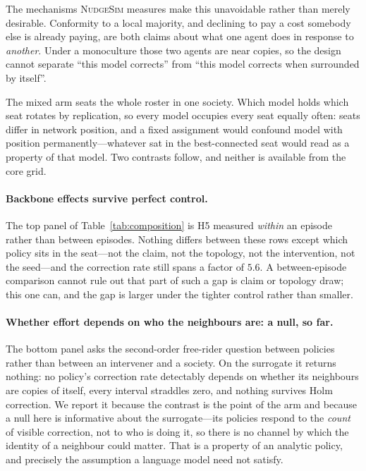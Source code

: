\documentclass{article}
\begin{document}
The mechanisms \textsc{NudgeSim} measures make this unavoidable rather than
merely desirable. Conformity to a local majority, and declining to pay a cost
somebody else is already paying, are both claims about what one agent does in
response to \emph{another}. Under a monoculture those two agents are near
copies, so the design cannot separate ``this model corrects'' from ``this model
corrects when surrounded by itself''.

The mixed arm seats the whole roster in one society. Which model holds which
seat rotates by replication, so every model occupies every seat equally often:
seats differ in network position, and a fixed assignment would confound model
with position permanently---whatever sat in the best-connected seat would read
as a property of that model. Two contrasts follow, and neither is available
from the core grid.

\begin{table}[t]
\centering

\caption{Top: what each model does inside the \emph{same} episode, with claim,
topology and intervention held exactly fixed. Bottom: the same model's
correction rate among other models against its rate among copies of itself.
$^{*}$ significant after Holm correction. \textbf{Properties of the declared
data-generating process, not results about language models.}}
\label{tab:composition}
\end{table}

\paragraph{Backbone effects survive perfect control.} The top panel of
Table~\ref{tab:composition} is H5 measured \emph{within} an episode rather than
between episodes. Nothing differs between these rows except which policy sits in
the seat---not the claim, not the topology, not the intervention, not the
seed---and the correction rate still spans a factor of $5.6$. A between-episode
comparison cannot rule out that part of such a gap is claim or topology draw;
this one can, and the gap is larger under the tighter control rather than
smaller.

\paragraph{Whether effort depends on who the neighbours are: a null, so far.}
The bottom panel asks the second-order free-rider question between policies
rather than between an intervener and a society. On the surrogate it returns
nothing: no policy's correction rate detectably depends on whether its
neighbours are copies of itself, every interval straddles zero, and nothing
survives Holm correction. We report it because the contrast is the point of the
arm and because a null here is informative about the surrogate---its policies
respond to the \emph{count} of visible correction, not to who is doing it, so
there is no channel by which the identity of a neighbour could matter. That is a
property of an analytic policy, and precisely the assumption a language model
need not satisfy.
\end{document}
